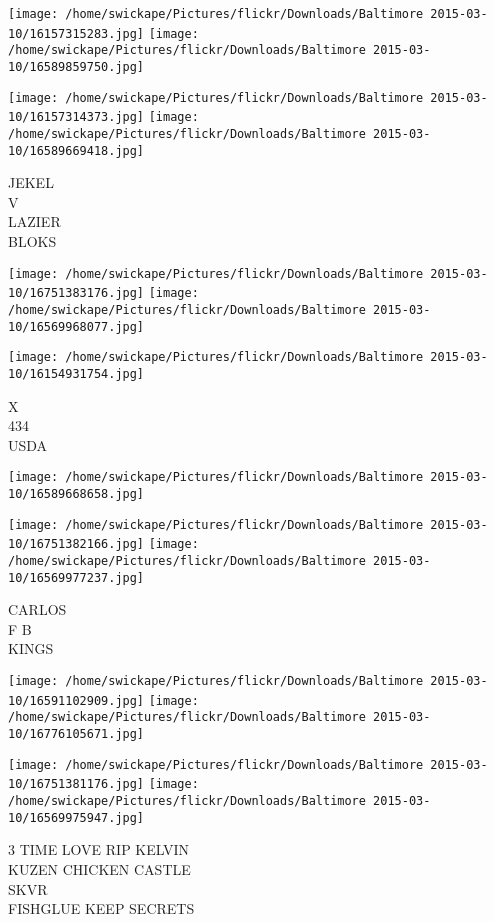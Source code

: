 \documentclass[10pt,letterpaper]{article}
\begin{document}
\texttt{[image: /home/swickape/Pictures/flickr/Downloads/Baltimore 2015-03-10/16157315283.jpg]}
\texttt{[image: /home/swickape/Pictures/flickr/Downloads/Baltimore 2015-03-10/16589859750.jpg]}

\texttt{[image: /home/swickape/Pictures/flickr/Downloads/Baltimore 2015-03-10/16157314373.jpg]}
\texttt{[image: /home/swickape/Pictures/flickr/Downloads/Baltimore 2015-03-10/16589669418.jpg]}

JEKEL\\
V\\
LAZIER\\
BLOKS\\
\pagebreak

\texttt{[image: /home/swickape/Pictures/flickr/Downloads/Baltimore 2015-03-10/16751383176.jpg]}
\texttt{[image: /home/swickape/Pictures/flickr/Downloads/Baltimore 2015-03-10/16569968077.jpg]}

\texttt{[image: /home/swickape/Pictures/flickr/Downloads/Baltimore 2015-03-10/16154931754.jpg]}

X\\
434\\
USDA\\
\pagebreak

\texttt{[image: /home/swickape/Pictures/flickr/Downloads/Baltimore 2015-03-10/16589668658.jpg]}

\vspace{0.25in}
\texttt{[image: /home/swickape/Pictures/flickr/Downloads/Baltimore 2015-03-10/16751382166.jpg]}
\texttt{[image: /home/swickape/Pictures/flickr/Downloads/Baltimore 2015-03-10/16569977237.jpg]}

CARLOS\\
F B\\
KINGS\\
\pagebreak

\texttt{[image: /home/swickape/Pictures/flickr/Downloads/Baltimore 2015-03-10/16591102909.jpg]}
\texttt{[image: /home/swickape/Pictures/flickr/Downloads/Baltimore 2015-03-10/16776105671.jpg]}

\texttt{[image: /home/swickape/Pictures/flickr/Downloads/Baltimore 2015-03-10/16751381176.jpg]}
\texttt{[image: /home/swickape/Pictures/flickr/Downloads/Baltimore 2015-03-10/16569975947.jpg]}

3 TIME LOVE RIP KELVIN\\
KUZEN CHICKEN CASTLE\\
SKVR\\
FISHGLUE KEEP SECRETS\\
\pagebreak
\end{document}
